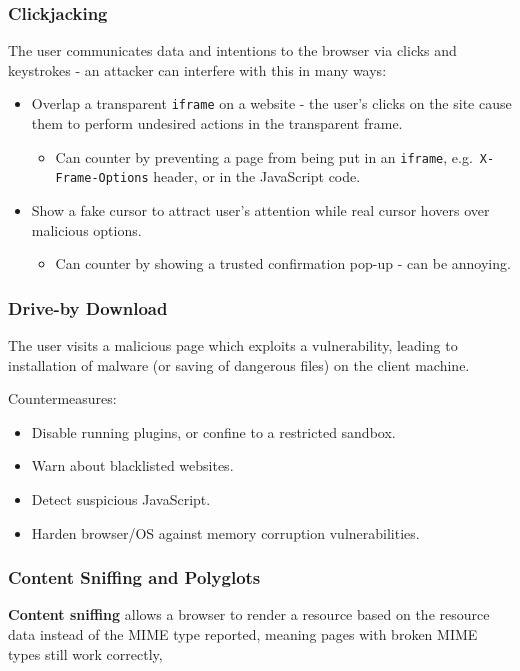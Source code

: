 \documentclass[11pt]{article}
\begin{document}
\subsubsection{Clickjacking}
The user communicates data and intentions to the browser via clicks and keystrokes - an attacker can interfere with this in many ways:
\begin{itemize}
  \item Overlap a transparent \texttt{iframe} on a website - the user's clicks on the site cause them to perform undesired actions in the transparent frame.
    \begin{itemize}
      \item Can counter by preventing a page from being put in an \texttt{iframe}, e.g.\ \texttt{X-Frame-Options} header, or in the JavaScript code.
    \end{itemize}
  \item Show a fake cursor to attract user's attention while real cursor hovers over malicious options.
    \begin{itemize}
      \item Can counter by showing a trusted confirmation pop-up - can be annoying.
    \end{itemize}
\end{itemize}

\subsubsection{Drive-by Download}
The user visits a malicious page which exploits a vulnerability, leading to installation of malware (or saving of dangerous files) on the client machine.

Countermeasures:
\begin{itemize}
  \item Disable running plugins, or confine to a restricted sandbox.
  \item Warn about blacklisted websites.
  \item Detect suspicious JavaScript.
  \item Harden browser/OS against memory corruption vulnerabilities.
\end{itemize}

\subsubsection{Content Sniffing and Polyglots}
\textbf{Content sniffing} allows a browser to render a resource based on the resource data instead of the MIME type reported, meaning pages with broken MIME types still work correctly,
\end{document}
